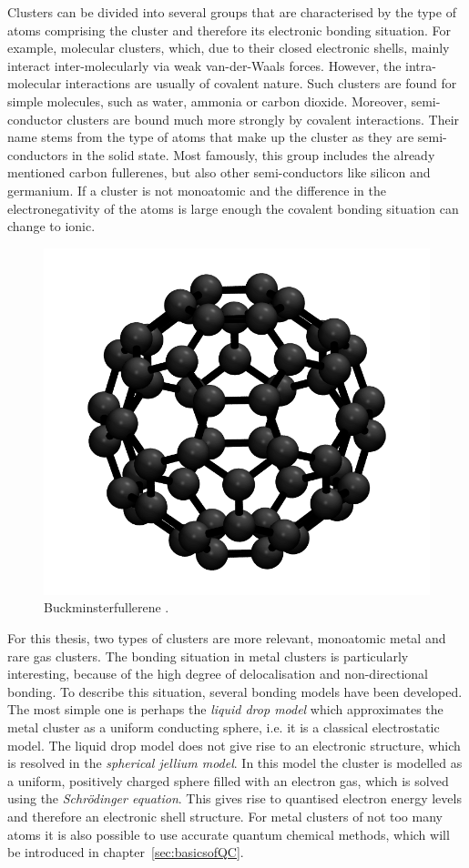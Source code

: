 Clusters can be divided into several groups that are characterised by the type
of atoms comprising the cluster and therefore its electronic bonding situation.
For example, molecular clusters, which, due to their closed electronic shells,
mainly interact inter-molecularly via weak van-der-Waals forces. However, the
intra-molecular interactions are usually of covalent nature. Such clusters are
found for simple molecules, such as water,\autocite{Liu_WaterClusters_1996}
ammonia\autocite{Beu_Structureammoniaclusters_2001} or carbon
dioxide.\autocite{Takeuchi_GeometryOptimizationCarbon_2008} Moreover,
semi-conductor clusters are bound much more strongly by covalent interactions.
Their name stems from the type of atoms that make up the cluster as they are
semi-conductors in the solid state. Most famously, this group includes the
already mentioned carbon
fullerenes\autocite{Kroto_C60Buckminsterfullerene_1985}, but also other
semi-conductors like silicon\autocite{Zhu_Structuresstabilitiessmall_2003a} and
germanium.\autocite{Pacchioni_Silicongermaniumclusters_1986} If a cluster is not
monoatomic and the difference in the electronegativity of the atoms is large
enough the covalent bonding situation can change to ionic.

\begin{figure}[htb]
    \centering
    \includegraphics[width=.5\textwidth]{golddual/C60Ih.png}
    \caption{Buckminsterfullerene .}
    \label{fig:C60example}
\end{figure}

For this thesis, two types of clusters are more relevant, monoatomic metal and
rare gas clusters. The bonding situation in metal clusters is particularly
interesting, because of the high degree of delocalisation and non-directional
bonding. To describe this situation, several bonding models have been developed.
The most simple one is perhaps the \emph{liquid drop model} which approximates
the metal cluster as a uniform conducting sphere, i.e. it is a classical
electrostatic model. The liquid drop model does not give rise to an electronic
structure, which is resolved in the \textit{spherical jellium model}. In this
model the cluster is modelled as a uniform, positively charged sphere filled
with an electron gas, which is solved using the \textit{Schr\"odinger equation}.
This gives rise to quantised electron energy levels and therefore an electronic
shell structure. For metal clusters of not too many atoms it is also possible to
use accurate quantum chemical methods, which will be introduced in
chapter~\ref{sec:basicsofQC}.

